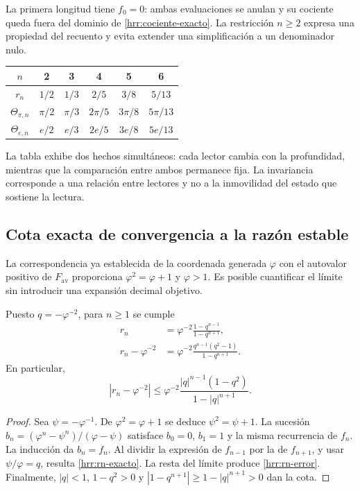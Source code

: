 La primera longitud tiene \(f_0=0\): ambas evaluaciones se anulan y su
cociente queda fuera del dominio de \eqref{hrr:cociente-exacto}. La
restricción \(n\geq2\) expresa una propiedad del recuento y evita
extender una simplificación a un denominador nulo.

\begin{center}
\begin{tabular}{c|ccccc}
\(n\)&2&3&4&5&6\\\hline
\(r_n\)&\(1/2\)&\(1/3\)&\(2/5\)&\(3/8\)&\(5/13\)\\
\(\Theta_{\pi,n}\)&\(\pi/2\)&\(\pi/3\)&\(2\pi/5\)&\(3\pi/8\)&\(5\pi/13\)\\
\(\Theta_{e,n}\)&\(e/2\)&\(e/3\)&\(2e/5\)&\(3e/8\)&\(5e/13\)
\end{tabular}
\end{center}
La tabla exhibe dos hechos simultáneos: cada lector cambia con la
profundidad, mientras que la comparación entre ambos permanece fija.
La invariancia corresponde a una relación entre lectores y no a la
inmovilidad del estado que sostiene la lectura.

\subsection{Cota exacta de convergencia a la razón estable}

La correspondencia ya establecida de la coordenada generada
\(\varphi\) con el autovalor positivo de
\(F_{\mathrm{av}}\) proporciona \(\varphi^2=\varphi+1\) y
\(\varphi>1\). Es posible cuantificar el límite sin introducir
una expansión decimal objetivo.

\begin{proposition}
\label{hrr:error-retorno}
Puesto \(q=-\varphi^{-2}\), para \(n\geq1\) se cumple
\begin{align}
 r_n&=\varphi^{-2}\frac{1-q^{n-1}}{1-q^{n+1}},
 \label{hrr:rn-exacto}\\
 r_n-\varphi^{-2}
 &=\varphi^{-2}
 \frac{q^{n-1}(q^2-1)}{1-q^{n+1}}.
 \label{hrr:rn-error}
\end{align}
En particular,
\begin{equation}
 |r_n-\varphi^{-2}|
 \leq\varphi^{-2}
 \frac{|q|^{n-1}(1-q^2)}{1-|q|^{n+1}}.
 \label{hrr:rn-cota}
\end{equation}
\end{proposition}
\begin{proof}
Sea \(\psi=-\varphi^{-1}\). De \(\varphi^2=\varphi+1\)
se deduce \(\psi^2=\psi+1\). La sucesión
\(b_n=(\varphi^n-\psi^n)/(\varphi-\psi)\)
satisface \(b_0=0\), \(b_1=1\) y la misma recurrencia de
\(f_n\). La inducción da \(b_n=f_n\). Al dividir la expresión
de \(f_{n-1}\) por la de \(f_{n+1}\), y usar
\(\psi/\varphi=q\), resulta \eqref{hrr:rn-exacto}.
La resta del límite produce \eqref{hrr:rn-error}. Finalmente,
\(|q|<1\), \(1-q^2>0\) y
\(|1-q^{n+1}|\geq1-|q|^{n+1}>0\) dan la cota.
\end{proof}


